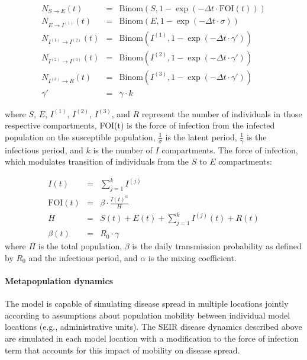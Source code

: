 {\begin{eqnarray}
N_{S \to E} (t) &=& \text{Binom}\left(S, 1 - \exp \left(- \Delta t \cdot \text{FOI}(t) \right)\right) \\
N_{E \to I^{( 1)}} (t) &=& \text{Binom}\left(E, 1 - \exp \left(- \Delta t \cdot \sigma  \right) \right) \\
N_{I^{( 1 )} \to I^{( 2)}} (t) &=& \text{Binom}\left(I^{( 1)}, 1 - \exp \left(- \Delta t \cdot \gamma' \right) \right) \\
N_{I^{(2)} \to I^{(3)}} (t) &=& \text{Binom}\left(I^{(2)}, 1 - \exp \left(- \Delta t \cdot \gamma' \right) \right) \\
N_{I^{(3)} \to R} (t) &=& \text{Binom}\left(I^{(3)}, 1 - \exp \left(- \Delta t \cdot \gamma' \right) \right) \\
\gamma' &=& \gamma \cdot k
\end{eqnarray}

where $S$, $E$, $I^{\left(1\right)}$, $I^{\left(2\right)}$, $I^{\left(3\right)}$, and $R$ represent the number of individuals in those respective compartments, FOI(t) is the force of infection from the infected population on the susceptible population, $\frac{1}{\sigma}$ is the latent period, $\frac{1}{\gamma}$ is the infectious period, and $k$ is the number of $I$ compartments. The force of infection, which modulates transition of individuals from the $S$ to $E$ compartments:

\begin{eqnarray}
I(t) &=& \sum\limits_{{j = 1}}^{k} I^{( j)} \\
\text{FOI}(t) &=&\beta \cdot \frac{I{(t)}^{\alpha}}{H} \\
H &=& S(t)+E(t)+\sum_{j=1}^{k} I^{\left(j\right)}(t)+R(t) \\
\beta(t) &=& R_{0}\cdot\gamma
\end{eqnarray}
where $H$ is the total population, $\beta$ is the daily transmission probability as defined by $R_0$ and the infectious period, and $\alpha$ is the mixing coefficient.


\paragraph{Metapopulation dynamics}
The model is capable of simulating disease spread in multiple locations jointly according to assumptions about population mobility between individual model locations (e.g., administrative units). The SEIR disease dynamics described above are simulated in each model location with a modification to the force of infection term that accounts for this impact of mobility on disease spread.

}
